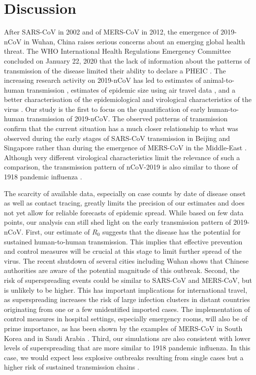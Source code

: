 \documentclass{article}
\begin{document}
\section*{Discussion}

After SARS-CoV in 2002 and of MERS-CoV in 2012, the emergence of 2019-nCoV in Wuhan, China raises serious concerns about an emerging global health threat.
The WHO International Health Regulations Emergency Committee concluded on January 22, 2020 that the lack of information about the patterns of transmission of the disease limited their ability to declare a PHEIC \cite{whoreco}.
The increasing research activity on 2019-nCoV has led to estimates of animal-to-human transmission \cite{Chen2020.01.19.911669}, estimates of epidemic size using air travel data \cite{Imai:2020, vespi:2020}, and a better characterisation of the epidemiological and virological characteristics of the virus \cite{peng2020real,Shi:2020}.
Our study is the first to focus on the quantification of early human-to-human transmission of 2019-nCoV.
The observed patterns of transmission confirm that the current situation has a much closer relationship to what was observed during the early stages of SARS-CoV transmission in Beijing and Singapore rather than during the emergence of MERS-CoV in the Middle-East \cite{Lloyd-Smith:2005,Kucharski:2015b}.
Although very different virological characteristics limit the relevance of such a comparison, the transmission pattern of nCoV-2019 is also similar to those of 1918 pandemic influenza \cite{Fraser:2011}.

The scarcity of available data, especially on case counts by date of disease onset as well as contact tracing, greatly limits the precision of our estimates and does not yet allow for reliable forecasts of epidemic spread.
While based on few data points, our analysis can still shed light on the early transmission pattern of 2019-nCoV.
First, our estimate of $R_0$ suggests that the disease has the potential for sustained human-to-human transmission.
This implies that effective prevention and control measures will be crucial at this stage to limit further spread of the virus.
The recent shutdown of several cities including Wuhan shows that Chinese authorities are aware of the potential magnitude of this outbreak.
Second, the risk of superspreading events could be similar to SARS-CoV and MERS-CoV, but is unlikely to be higher.
This has important implications for international travel, as superspreading increases the risk of large infection clusters in distant countries originating from one or a few unidentified imported cases.
The implementation of control measures in hospital settings, especially emergency rooms, will also be of prime importance, as has been shown by the examples of MERS-CoV in South Korea \cite{oh2015middle} and in Saudi Arabia \cite{assiri2013hospital}.
Third, our simulations are also consistent with lower levels of superspreading that are more similar to 1918 pandemic influenza. In this case, we would expect less explosive outbreaks resulting from single cases but a higher risk of sustained transmission chains \cite{Lloyd-Smith:2005}.
\end{document}
